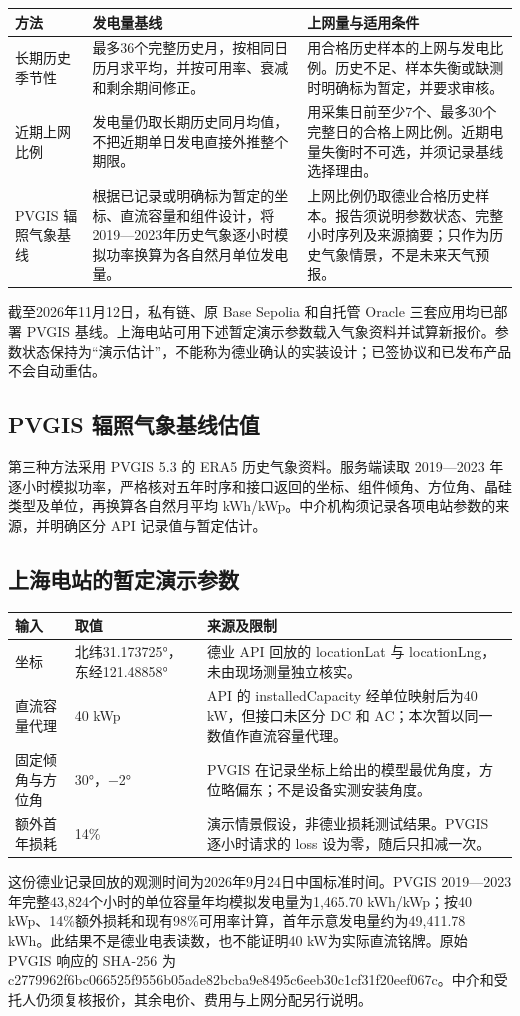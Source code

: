 \documentclass[12pt,a4paper]{article}
\begin{document}
\begin{longtable}{L{3.1cm}L{5.4cm}L{6.2cm}}\toprule 方法 & 发电量基线 & 上网量与适用条件\\\midrule
长期历史季节性 & 最多36个完整历史月，按相同日历月求平均，并按可用率、衰减和剩余期间修正。 & 用合格历史样本的上网与发电比例。历史不足、样本失衡或缺测时明确标为暂定，并要求审核。\\\midrule
近期上网比例 & 发电量仍取长期历史同月均值，不把近期单日发电直接外推整个期限。 & 用采集日前至少7个、最多30个完整日的合格上网比例。近期电量失衡时不可选，并须记录基线选择理由。\\\midrule
PVGIS 辐照气象基线 & 根据已记录或明确标为暂定的坐标、直流容量和组件设计，将2019—2023年历史气象逐小时模拟功率换算为各自然月单位发电量。 & 上网比例仍取德业合格历史样本。报告须说明参数状态、完整小时序列及来源摘要；只作为历史气象情景，不是未来天气预报。\\\bottomrule\end{longtable}
截至2026年11月12日，私有链、原 Base Sepolia 和自托管 Oracle 三套应用均已部署 PVGIS 基线。上海电站可用下述暂定演示参数载入气象资料并试算新报价。参数状态保持为“演示估计”，不能称为德业确认的实装设计；已签协议和已发布产品不会自动重估。

\clearpage
\subsection{PVGIS 辐照气象基线估值}
第三种方法采用 PVGIS 5.3 的 ERA5 历史气象资料。服务端读取 2019—2023 年逐小时模拟功率，严格核对五年时序和接口返回的坐标、组件倾角、方位角、晶硅类型及单位，再换算各自然月平均 kWh/kWp。中介机构须记录各项电站参数的来源，并明确区分 API 记录值与暂定估计。

\subsection{上海电站的暂定演示参数}
\begin{longtable}{L{3.5cm}L{3.2cm}L{8cm}}\toprule 输入 & 取值 & 来源及限制\\\midrule
坐标 & 北纬31.173725°，东经121.48858° & 德业 API 回放的 locationLat 与 locationLng，未由现场测量独立核实。\\\midrule
直流容量代理 & 40 kWp & API 的 installedCapacity 经单位映射后为40 kW，但接口未区分 DC 和 AC；本次暂以同一数值作直流容量代理。\\\midrule
固定倾角与方位角 & 30°，−2° & PVGIS 在记录坐标上给出的模型最优角度，方位略偏东；不是设备实测安装角度。\\\midrule
额外首年损耗 & 14\% & 演示情景假设，非德业损耗测试结果。PVGIS 逐小时请求的 loss 设为零，随后只扣减一次。\\\bottomrule\end{longtable}
这份德业记录回放的观测时间为2026年9月24日中国标准时间。PVGIS 2019—2023年完整43,824个小时的单位容量年均模拟发电量为1,465.70 kWh/kWp；按40 kWp、14\%额外损耗和现有98\%可用率计算，首年示意发电量约为49,411.78 kWh。此结果不是德业电表读数，也不能证明40 kW为实际直流铭牌。原始 PVGIS 响应的 SHA-256 为 c2779962f6bc066525f9556b05ade82bcba9e8495c6eeb30c1cf31f20eef067c。中介和受托人仍须复核报价，其余电价、费用与上网分配另行说明。
\end{document}
